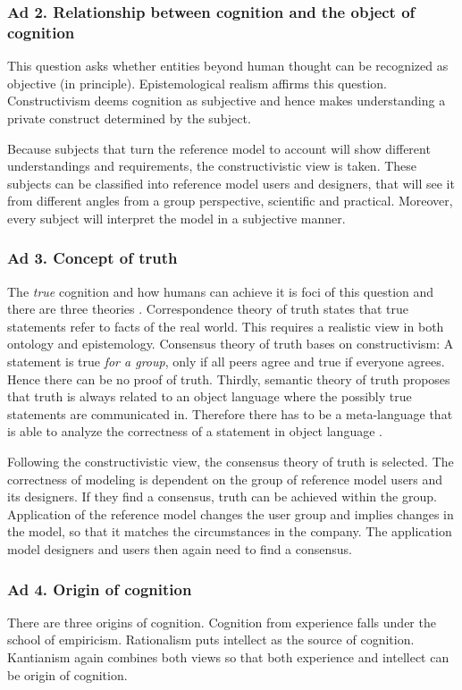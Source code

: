 \subsubsection{Ad 2. Relationship between cognition and the object of cognition}
This question asks whether entities beyond human thought can be recognized as objective (in principle). Epistemological realism affirms this question. Constructivism deems cognition as subjective and hence makes understanding a private construct determined by the subject. 

Because subjects that turn the reference model to account will show different understandings and requirements, the constructivistic view is taken. These subjects can be classified into reference model users and designers, that will see it from different angles from a group perspective, \eg scientific and practical. Moreover, every subject will interpret the model in a subjective manner.

\subsubsection{Ad 3. Concept of truth}
The \textit{true} cognition and how humans can achieve it is foci of this question and there are three theories \citep{habermas1973}. Correspondence theory of truth states that true statements refer to facts of the real world. This requires a realistic view in both ontology and epistemology. Consensus theory of truth bases on constructivism: A statement is true\textit{ for a group}, only if all peers agree and true if everyone agrees. Hence there can be no proof of truth. Thirdly, semantic theory of truth proposes that truth is always related to an object language where the possibly true statements are communicated in. Therefore there has to be a meta-language that is able to analyze the correctness of a statement in object language \citep{tarski1944}. 

Following the constructivistic view, the consensus theory of truth is selected. The correctness of modeling is dependent on the group of reference model users and its designers. If they find a consensus, truth can be achieved within the group. Application of the reference model changes the user group and implies changes in the model, so that it matches the circumstances in the company. The application model designers and users then again need to find a consensus.

\subsubsection{Ad 4. Origin of cognition}
There are three origins of cognition. Cognition from experience falls under the school of empiricism. Rationalism puts intellect as the source of cognition. Kantianism again combines both views so that both experience and intellect can be origin of cognition. 

